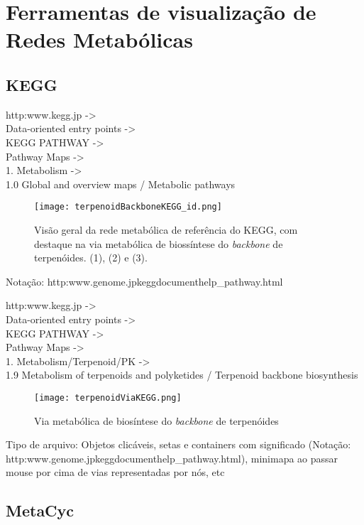 
\chapter{Ferramentas de visualização de Redes Metabólicas}


\section{KEGG}

http:\/\/www.kegg.jp\/ -> \\ Data-oriented entry points  -> \\KEGG PATHWAY ->\\ Pathway Maps -> \\1. Metabolism  -> \\1.0 Global and overview maps / Metabolic pathways

\begin{figure}[h]
\centering
\texttt{[image: terpenoidBackboneKEGG\_id.png]}
\caption{Visão geral da rede metabólica de referência do KEGG, com destaque na via metabólica de biossíntese do \textit{backbone} de terpenóides. (1), (2) e (3).}
\label{terpenoidBackboneKEGG}
\end{figure}


Notação: http:\/\/www.genome.jp\/kegg\/document\/help\_pathway.html



http:\/\/www.kegg.jp\/ -> \\ Data-oriented entry points  -> \\KEGG PATHWAY ->\\ Pathway Maps -> \\1. Metabolism/Terpenoid/PK   -> \\1.9 Metabolism of terpenoids and polyketides / Terpenoid backbone biosynthesis

\begin{figure}[h]
\centering
\texttt{[image: terpenoidViaKEGG.png]}
\caption{Via metabólica de biosíntese do \textit{backbone} de terpenóides}
\label{terpenoidBackboneKEGG}
\end{figure}


Tipo de arquivo:
Objetos clicáveis, setas e containers com significado (Notação: http:\/\/www.genome.jp\/kegg\/document\/help\_pathway.html), minimapa ao passar mouse por cima de vias representadas por nós, etc

\section{MetaCyc}


